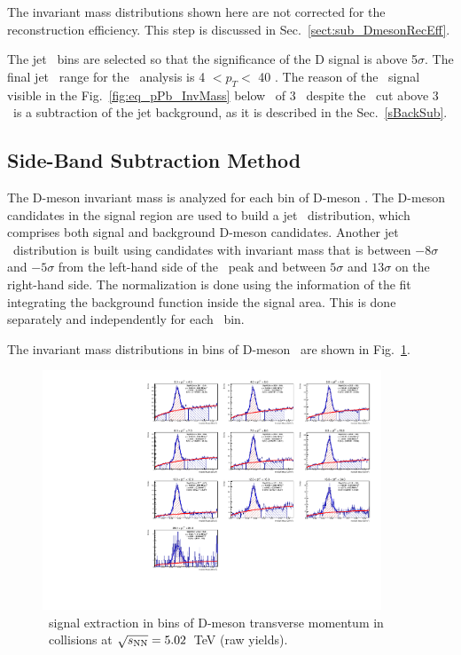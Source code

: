 The invariant mass distributions shown here are not corrected for the reconstruction efficiency. This step is discussed in Sec.~\ref{sect:sub_DmesonRecEff}.

The jet \pt\ bins are selected so that the significance of the D signal is above 5$\sigma$.
The final jet \pt\ range for the \pPb\ analysis is 4 $< p_{T} < $ 40 \GeVc. The reason of the \Dstar\ signal visible in the Fig.~\ref{fig:eq_pPb_InvMass} below \ptjet\ of 3 \GeVc\ despite the \ptd\ cut above 3 \GeVc\ is a subtraction of the jet background, as it is described in the Sec.~\ref{sBackSub}.


\subsection{Side-Band Subtraction Method}
\label{sub_Bin_d_pT}

The D-meson invariant mass is analyzed for each bin of D-meson \pt. 
The D-meson candidates in the signal region are used to build a jet \pt\ distribution, which comprises both signal and background D-meson candidates.
Another jet \pt\ distribution is built using candidates with invariant mass that is between $-8\sigma$ and $-5\sigma$ from the left-hand side of the \Dstar\ peak and between $5\sigma$ and $13\sigma$ on the right-hand side.
The normalization is done using the information of the fit integrating the background function inside the signal area. This is done separately and independently for each \ptd\ bin.

The invariant mass distributions in bins of D-meson \pt\ are shown in Fig.~\ref{fig:eq_pPb_InvMass_Dbins}.

\begin{figure}[bth]
\centering
\includegraphics[width=0.9\textwidth]{pPbplots/plotsSB_noEff_pt3_noDetails/invMass_FASTwoSDD}
\caption{\Dstar\ signal extraction in bins of D-meson transverse momentum in \pPb\ collisions at $\sqrt{s_{\rm NN}}=5.02$~TeV (raw yields).}
\label{fig:eq_pPb_InvMass_Dbins}
\end{figure}

